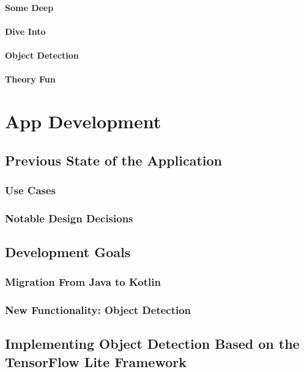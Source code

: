 \documentclass[
			   fontsize=11pt,
               paper=a4,
               bibliography=totoc,
               idxtotoc,
               headsepline,
               footsepline,
               footinclude=false,
               BCOR=12mm,
               DIV=13,
               openany,   %
               ]
               {scrbook}
\begin{document}
\subsubsection{Some Deep}
\subsubsection{Dive Into}
\subsubsection{Object Detection}
\subsubsection{Theory Fun}

\chapter{App Development}

\section{Previous State of the Application}

\subsection{Use Cases}

\subsection{Notable Design Decisions}

\section{Development Goals}

\subsection{Migration From Java to Kotlin}

\subsection{New Functionality: Object Detection}

\section{Implementing Object Detection Based on the TensorFlow Lite Framework}
\end{document}
